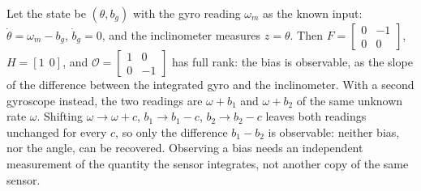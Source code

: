 \begin{solutions}
  \item Let the state be $(\theta, b_g)$ with the gyro reading $\omega_m$ as the known input: $\dot\theta = \omega_m - b_g$, $\dot b_g = 0$, and the inclinometer
        measures $z = \theta$. Then $F = \begin{bmatrix}0 & -1\\0 & 0\end{bmatrix}$, $H = [1\ \ 0]$, and $\mathcal O = \begin{bmatrix}1 & 0\\0 & -1\end{bmatrix}$ has full rank: the bias is
        observable, as the slope of the difference between the integrated gyro and the inclinometer. With a second gyroscope instead, the two
        readings are $\omega + b_1$ and $\omega + b_2$ of the same unknown rate $\omega$. Shifting $\omega \to \omega + c$, $b_1 \to b_1 - c$, $b_2 \to b_2 - c$ leaves both readings
        unchanged for every $c$, so only the difference $b_1 - b_2$ is observable: neither bias, nor the angle, can be recovered. Observing a bias
        needs an independent measurement of the quantity the sensor integrates, not another copy of the same sensor.
\end{solutions}
